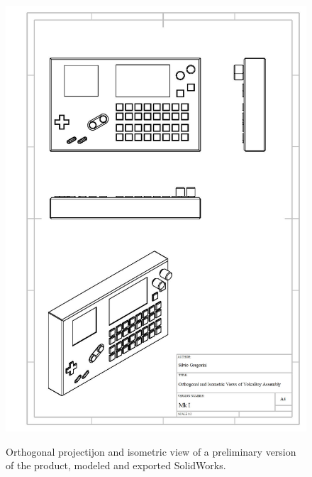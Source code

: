 \documentclass[]{article}
\begin{document}
\begin{appendices}
            \appendix
            \begin{figure}[h]
                \vspace*{-1cm}
                \textbf{}\\   %
                \hspace*{-1cm}
                \includegraphics[width=1.1\textwidth]{volca-boy-draw-page-001.jpg}
                    \caption{Orthogonal projectijon and isometric view of a preliminary version of the product, modeled and exported SolidWorks.}
                \end{figure}
\pagebreak

            \appendix
            \begin{table}[h]
                \textbf{}\\  %
                

\end{table}
\end{appendices}
\end{document}

